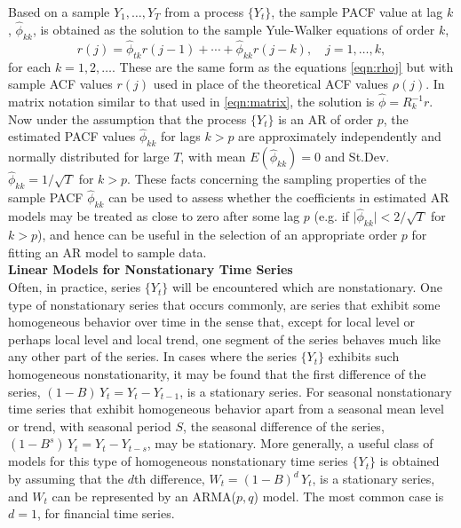 Based on a sample $Y_1, \ldots, Y_T$ from a process $\{ Y_t \}$, the sample PACF value at lag $k$, $\hat{\phi}_{kk}$, is obtained as the solution to the sample Yule-Walker equations of order $k$,
	\begin{equation} \label{eqn:rjequation}
	r(j) = \hat{\phi}_{tk} r(j-1) + \cdots + \hat{\phi}_{kk} r(j-k), \quad j = 1, \ldots ,k,
	\end{equation}
for each $k= 1, 2, \ldots$. These are the same form as the equations \eqref{eqn:rhoj} but with sample ACF values $r(j)$ used in place of the theoretical ACF values $\rho(j)$. In matrix notation similar to that used in \eqref{eqn:matrix}, the solution is $\hat{\phi} = R_k^{-1} r$. Now under the assumption that the process $\{ Y_t \}$ is an AR of order $p$, the estimated PACF values $\hat{\phi}_{kk}$ for lags $k > p$ are approximately independently and normally distributed for large $T$, with mean $E(\hat{\phi}_{kk})= 0$ and St.Dev. $\hat{\phi}_{kk} = 1 / \sqrt{T}$ for $k > p$. These facts concerning the sampling properties of the sample PACF $\hat{\phi}_{kk}$ can be used to assess whether the coefficients in estimated AR models may be treated as close to zero after some lag $p$ (e.g. if $\lvert \hat{\phi}_{kk} \rvert < 2 / \sqrt{T}$ for $k > p$), and hence can be useful in the selection of an appropriate order $p$ for fitting an AR model to sample data. \\


\noindent\textbf{Linear Models for Nonstationary Time Series} \\


Often, in practice, series $\{ Y_t \}$ will be encountered which are nonstationary. One type of nonstationary series that occurs commonly, are series that exhibit some homogeneous behavior over time in the sense that, except for local level or perhaps local level and local trend, one segment of the series behaves much like any other part of the series. In cases where the series $\{ Y_t \}$ exhibits such homogeneous nonstationarity, it may be found that the first difference of the series, $(1 - B)\, Y_t = Y_t - Y_{t-1}$, is a stationary series. For seasonal nonstationary time series that exhibit homogeneous behavior apart from a seasonal mean level or trend, with seasonal period $S$, the seasonal difference of the series, $(1 - B^s)\, Y_t = Y_t - Y_{t-s}$, may be stationary. More generally, a useful class of models for this type of homogeneous nonstationary time series $\{Y_t\}$ is obtained by assuming that the $d$th difference, $W_t = (1 - B)^d\,Y_t$, is a stationary series, and $W_t$ can be represented by an ARMA($p,q$) model. The most common case is $d=1$, for financial time series. \\



